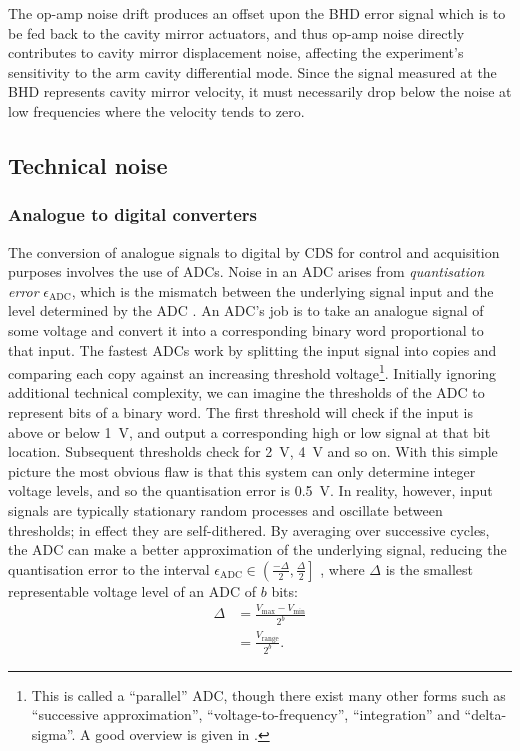 The op-amp noise drift produces an offset upon the \gls{BHD} error signal which is to be fed back to the cavity mirror actuators, and thus op-amp noise directly contributes to cavity mirror displacement noise, affecting the experiment's sensitivity to the arm cavity differential mode. Since the signal measured at the \gls{BHD} represents cavity mirror velocity, it must necessarily drop below the noise at low frequencies where the velocity tends to zero.

\subsection{Technical noise}

\subsubsection{Analogue to digital converters}
The conversion of analogue signals to digital by \gls{CDS} for control and acquisition purposes involves the use of \glspl{ADC}. Noise in an \gls{ADC} arises from \emph{quantisation error} $\epsilon_{\text{ADC}}$, which is the mismatch between the underlying signal input and the level determined by the \gls{ADC} \cite{Allen1997}. An \gls{ADC}'s job is to take an analogue signal of some voltage and convert it into a corresponding binary word proportional to that input. The fastest \glspl{ADC} work by splitting the input signal into copies and comparing each copy against an increasing threshold voltage\footnote{This is called a ``parallel'' \gls{ADC}, though there exist many other forms such as ``successive approximation'', ``voltage-to-frequency'', ``integration'' and ``delta-sigma''. A good overview is given in \cite{Horowitz2015}.}. Initially ignoring additional technical complexity, we can imagine the thresholds of the \gls{ADC} to represent bits of a binary word. The first threshold will check if the input is above or below \SI{1}{\volt}, and output a corresponding high or low signal at that bit location. Subsequent thresholds check for \SI{2}{\volt}, \SI{4}{\volt} and so on. With this simple picture the most obvious flaw is that this system can only determine integer voltage levels, and so the quantisation error is \SI{0.5}{\volt}. In reality, however, input signals are typically stationary random processes and oscillate between thresholds; in effect they are self-dithered. By averaging over successive cycles, the \gls{ADC} can make a better approximation of the underlying signal, reducing the quantisation error to the interval $\epsilon_{\text{ADC}} \in \left( \frac{-\Delta}{2}, \frac{\Delta}{2} \right]$ \cite{Allen1997}, where $\Delta$ is the smallest representable voltage level of an \gls{ADC} of $b$ bits:
\begin{equation}
  \begin{split}
    \Delta &= \frac{V_{\text{max}} - V_{\text{min}}}{2^{b}} \\
           &= \frac{V_{\text{range}}}{2^{b}}.
  \end{split}
\end{equation}

